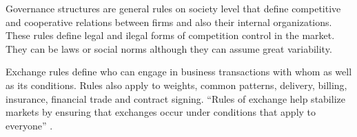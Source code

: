 \documentclass[a4paper, 12pt, openright, oneside, german, french, brazil, english, article]{abntex2}
\begin{document}
	
	Governance structures are general rules on society level that define competitive and cooperative relations between firms and also their internal organizations. These rules define legal and ilegal forms of competition control in the market. They can be laws or social norms although they can assume great variability.
	
	
	
	Exchange rules define who can engage in business transactions with whom as well as its conditions. Rules also apply to weights, common patterns, delivery, billing, insurance, financial trade and contract signing. ``Rules of exchange help stabilize markets by ensuring that exchanges occur under conditions that apply to everyone'' \cite[p. 35]{fligstein2002architecture}.
	
\end{document}
